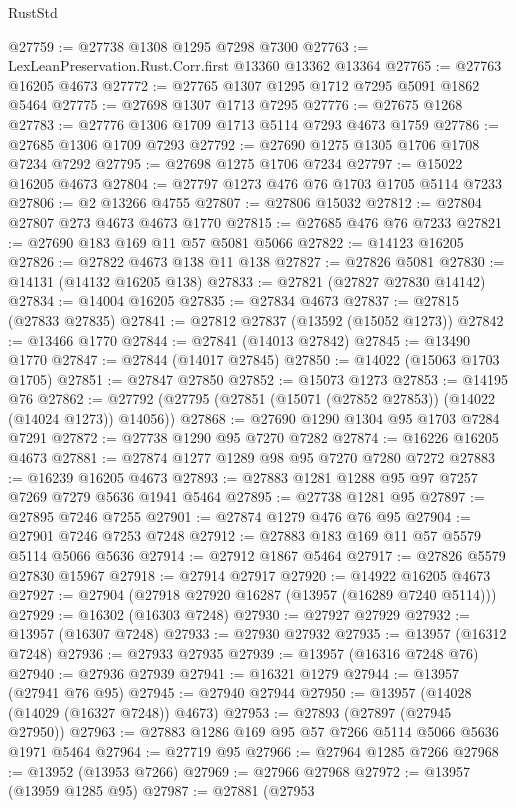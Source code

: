 \begin{lexlean}{RustStd}
\begin{coremodule}
@27759 := @27738 @1308 @1295 @7298 @7300
@27763 := LexLeanPreservation.Rust.Corr.first @13360 @13362 @13364
@27765 := @27763 @16205 @4673
@27772 := @27765 @1307 @1295 @1712 @7295 @5091 @1862 @5464
@27775 := @27698 @1307 @1713 @7295
@27776 := @27675 @1268
@27783 := @27776 @1306 @1709 @1713 @5114 @7293 @4673 @1759
@27786 := @27685 @1306 @1709 @7293
@27792 := @27690 @1275 @1305 @1706 @1708 @7234 @7292
@27795 := @27698 @1275 @1706 @7234
@27797 := @15022 @16205 @4673
@27804 := @27797 @1273 @476 @76 @1703 @1705 @5114 @7233
@27806 := @2 @13266 @4755
@27807 := @27806 @15032
@27812 := @27804 @27807 @273 @4673 @4673 @1770
@27815 := @27685 @476 @76 @7233
@27821 := @27690 @183 @169 @11 @57 @5081 @5066
@27822 := @14123 @16205
@27826 := @27822 @4673 @138 @11 @138
@27827 := @27826 @5081
@27830 := @14131 (@14132 @16205 @138)
@27833 := @27821 (@27827 @27830 @14142)
@27834 := @14004 @16205
@27835 := @27834 @4673
@27837 := @27815 (@27833 @27835)
@27841 := @27812 @27837 (@13592 (@15052 @1273))
@27842 := @13466 @1770
@27844 := @27841 (@14013 @27842)
@27845 := @13490 @1770
@27847 := @27844 (@14017 @27845)
@27850 := @14022 (@15063 @1703 @1705)
@27851 := @27847 @27850
@27852 := @15073 @1273
@27853 := @14195 @76
@27862 := @27792 (@27795 (@27851 (@15071 (@27852 @27853)) (@14022 (@14024 @1273)) @14056))
@27868 := @27690 @1290 @1304 @95 @1703 @7284 @7291
@27872 := @27738 @1290 @95 @7270 @7282
@27874 := @16226 @16205 @4673
@27881 := @27874 @1277 @1289 @98 @95 @7270 @7280 @7272
@27883 := @16239 @16205 @4673
@27893 := @27883 @1281 @1288 @95 @97 @7257 @7269 @7279 @5636 @1941 @5464
@27895 := @27738 @1281 @95
@27897 := @27895 @7246 @7255
@27901 := @27874 @1279 @476 @76 @95
@27904 := @27901 @7246 @7253 @7248
@27912 := @27883 @183 @169 @11 @57 @5579 @5114 @5066 @5636
@27914 := @27912 @1867 @5464
@27917 := @27826 @5579 @27830 @15967
@27918 := @27914 @27917
@27920 := @14922 @16205 @4673
@27927 := @27904 (@27918 @27920 @16287 (@13957 (@16289 @7240 @5114)))
@27929 := @16302 (@16303 @7248)
@27930 := @27927 @27929
@27932 := @13957 (@16307 @7248)
@27933 := @27930 @27932
@27935 := @13957 (@16312 @7248)
@27936 := @27933 @27935
@27939 := @13957 (@16316 @7248 @76)
@27940 := @27936 @27939
@27941 := @16321 @1279
@27944 := @13957 (@27941 @76 @95)
@27945 := @27940 @27944
@27950 := @13957 (@14028 (@14029 (@16327 @7248)) @4673)
@27953 := @27893 (@27897 (@27945 @27950))
@27963 := @27883 @1286 @169 @95 @57 @7266 @5114 @5066 @5636 @1971 @5464
@27964 := @27719 @95
@27966 := @27964 @1285 @7266
@27968 := @13952 (@13953 @7266)
@27969 := @27966 @27968
@27972 := @13957 (@13959 @1285 @95)
@27987 := @27881
    (@27953

\end{coremodule}
\end{lexlean}
